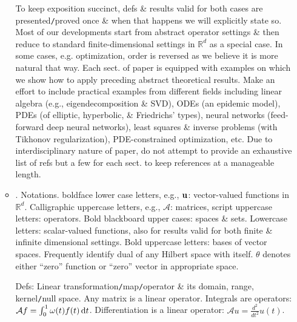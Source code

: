 \documentclass{article}
\begin{document}
\begin{enumerate}
\begin{itemize}
\begin{itemize}
		\end{itemize}
		To keep exposition succinct, defs \& results valid for both cases are presented{\tt/}proved once \& when that happens we will explicitly state so. Most of our developments start from abstract operator settings \& then reduce to standard finite-dimensional settings in $\mathbb{R}^d$ as a special case. In some cases, e.g. optimization, order is reversed as we believe it is more natural that way. Each sect. of paper is equipped with examples on which we show how to apply preceding abstract theoretical results. Make an effort to include practical examples from different fields including linear algebra (e.g., eigendecomposition \& SVD), ODEs (an epidemic model), PDEs (of elliptic, hyperbolic, \& Friedrichs' types), neural networks (feed-forward deep neural networks), least squares \& inverse problems (with Tikhonov regularization), PDE-constrained optimization, etc. Due to interdisciplinary nature of paper, do not attempt to provide an exhaustive list of refs but a few for each sect. to keep references at a manageable length.
				
		\item {. Notations.} boldface lower case letters, e.g., ${\bf u}$: vector-valued functions in $\mathbb{R}^d$. Calligraphic uppercase letters, e.g., $\mathcal{A}$: matrices, script uppercase letters: operators. Bold blackboard upper cases: spaces \& sets. Lowercase letters: scalar-valued functions, also for results valid for both finite \& infinite dimensional settings. Bold uppercase letters: bases of vector spaces. Frequently identify dual of any Hilbert space with itself. $\theta$ denotes either ``zero'' function or ``zero'' vector in appropriate space.
		
		Defs: Linear transformation{\tt/}map{\tt/}operator \& its domain, range, kernel{\tt/}null space. Any matrix is a linear operator. Integrals are operators: $\mathcal{A}f = \int_0^1 \omega(t)f(t)\,{\rm d}t$. Differentiation is a linear operator: $\mathcal{A}u = \frac{d^2}{dt^2}u(t)$.
		

\end{itemize}
\end{enumerate}
\end{document}

